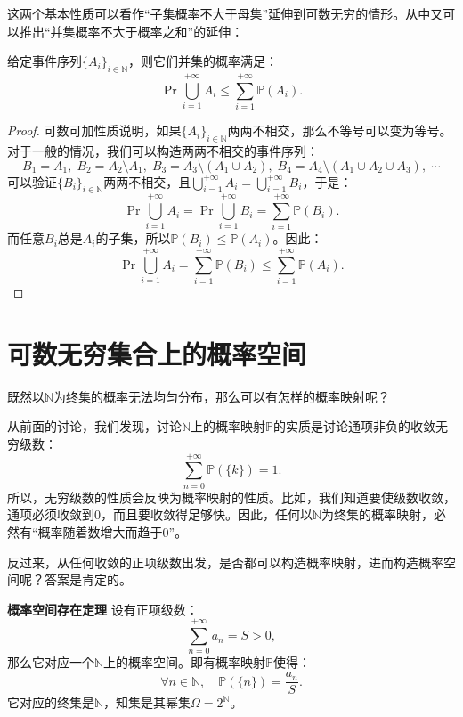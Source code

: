 \documentclass[12pt,UTF8]{ctexbook}
\begin{document}
这两个基本性质可以看作“子集概率不大于母集”延伸到可数无穷的情形。从中又可以推出“并集概率不大于概率之和”的延伸：
\begin{tm}
    给定事件序列$\{A_i\}_{i\in\mathbb{N}}$，则它们并集的概率满足：
    $$ \Pr{\bigcup_{i=1}^{+\infty} A_i} \leqslant \sum_{i=1}^{+\infty} \mathbb{P}(A_i). $$
\end{tm}

\begin{proof}
    可数可加性质说明，如果$\{A_i\}_{i\in\mathbb{N}}$两两不相交，那么不等号可以变为等号。对于一般的情况，我们可以构造两两不相交的事件序列：
    $$ B_1 = A_1, \; B_2 = A_2\setminus A_1, \; B_3 = A_3\setminus (A_1 \cup A_2), \; B_4 = A_4\setminus (A_1 \cup A_2 \cup A_3), \; \cdots$$
    可以验证$\{B_i\}_{i\in\mathbb{N}}$两两不相交，且$\bigcup_{i=1}^{+\infty} A_i = \bigcup_{i=1}^{+\infty} B_i$，于是：
    $$  \Pr{\bigcup_{i=1}^{+\infty} A_i} = \Pr{\bigcup_{i=1}^{+\infty} B_i} = \sum_{i=1}^{+\infty} \mathbb{P}(B_i). $$
    而任意$B_i$总是$A_i$的子集，所以$\mathbb{P}(B_i)\leqslant \mathbb{P}(A_i)$。因此：
    $$ \Pr{\bigcup_{i=1}^{+\infty} A_i} = \sum_{i=1}^{+\infty} \mathbb{P}(B_i) \leqslant \sum_{i=1}^{+\infty} \mathbb{P}(A_i). $$
\end{proof}

\section{可数无穷集合上的概率空间}

既然以$\mathbb{N}$为终集的概率无法均匀分布，那么可以有怎样的概率映射呢？

从前面的讨论，我们发现，讨论$\mathbb{N}$上的概率映射$\mathbb{P}$的实质是讨论通项非负的收敛无穷级数：
$$ \sum_{n=0}^{+\infty} \mathbb{P}(\{k\}) = 1. $$
所以，无穷级数的性质会反映为概率映射的性质。比如，我们知道要使级数收敛，通项必须收敛到$0$，而且要收敛得足够快。因此，任何以$\mathbb{N}$为终集的概率映射，必然有“概率随着数增大而趋于$0$”。

反过来，从任何收敛的正项级数出发，是否都可以构造概率映射，进而构造概率空间呢？答案是肯定的。
\begin{tm}{\textbf{概率空间存在定理}}
    设有正项级数：
    $$ \sum_{n=0}^{+\infty} a_n = S > 0,$$
    那么它对应一个$\mathbb{N}$上的概率空间。即有概率映射$\mathbb{P}$使得：
    $$ \forall n\in\mathbb{N},\quad \mathbb{P}(\{n\}) = \frac{a_n}{S}.$$
    它对应的终集是$\mathbb{N}$，知集是其幂集$\Omega = 2^{\mathbb{N}}$。
\end{tm}
\end{document}
